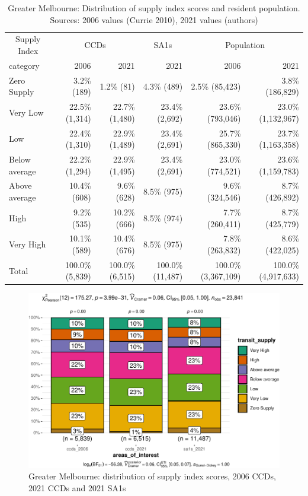 \documentclass[preprint, 3p,
authoryear]{elsarticle} %
\begin{document}
\begin{table}

\caption{\label{tab:Greater_Melbourne_SA1_2021_table}Greater Melbourne: Distribution of supply index scores and resident population. Sources: 2006 values (Currie 2010), 2021 values (authors)}
\centering
\begin{tabular}[t]{l|r|r|r|r|r}
\hline
\multicolumn{1}{c|}{Supply Index} & \multicolumn{2}{c|}{CCDs} & \multicolumn{1}{c|}{SA1s} & \multicolumn{2}{c}{Population} \\
\cline{1-1} \cline{2-3} \cline{4-4} \cline{5-6}
category & 2006 & 2021 & 2021 & 2006 & 2021\\
\hline
Zero Supply & 3.2\%   (189) & 1.2\%    (81) & 4.3\%    (489) & 2.5\%    (85,423) & 3.8\%   (186,829)\\
\hline
Very Low & 22.5\% (1,314) & 22.7\% (1,480) & 23.4\%  (2,692) & 23.6\%   (793,046) & 23.0\% (1,132,967)\\
\hline
Low & 22.4\% (1,310) & 22.9\% (1,489) & 23.4\%  (2,691) & 25.7\%   (865,330) & 23.7\% (1,163,358)\\
\hline
Below average & 22.2\% (1,294) & 22.9\% (1,495) & 23.4\%  (2,691) & 23.0\%   (774,521) & 23.6\% (1,159,783)\\
\hline
Above average & 10.4\%   (608) & 9.6\%   (628) & 8.5\%    (975) & 9.6\%   (324,546) & 8.7\%   (426,892)\\
\hline
High & 9.2\%   (535) & 10.2\%   (666) & 8.5\%    (974) & 7.7\%   (260,411) & 8.7\%   (425,779)\\
\hline
Very High & 10.1\%   (589) & 10.4\%   (676) & 8.5\%    (975) & 7.8\%   (263,832) & 8.6\%   (422,025)\\
\hline
Total & 100.0\% (5,839) & 100.0\% (6,515) & 100.0\% (11,487) & 100.0\% (3,367,109) & 100.0\% (4,917,633)\\
\hline
\end{tabular}
\end{table}

\begin{figure}
\centering
\includegraphics{Leveraging_GTFS_to_assess_transit_supply_Transport_Geography_files/figure-latex/Greater_Melbourne_SA1_2021_table-1.pdf}
\caption{Greater Melbourne: distribution of supply index scores, 2006
CCDs, 2021 CCDs and 2021 SA1s}
\end{figure}
\end{document}
